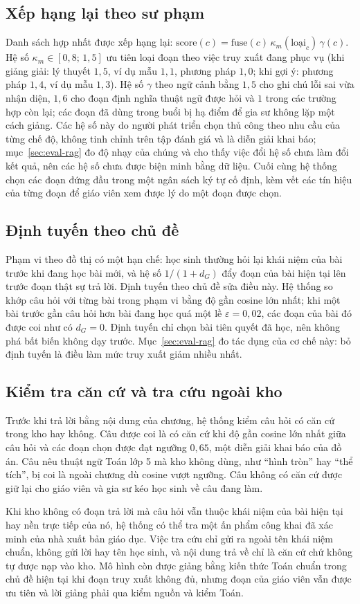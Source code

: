 \subsection{Xếp hạng lại theo sư phạm}
Danh sách hợp nhất được xếp hạng lại: $\mathrm{score}(c)=\mathrm{fuse}(c)\,\kappa_m(\text{loại}_c)\,\gamma(c)$. Hệ số $\kappa_m\in[0{,}8;\,1{,}5]$ ưu tiên loại đoạn theo việc truy xuất đang phục vụ (khi giảng giải: lý thuyết $1{,}5$, ví dụ mẫu $1{,}1$, phương pháp $1{,}0$; khi gợi ý: phương pháp $1{,}4$, ví dụ mẫu $1{,}3$). Hệ số $\gamma$ theo ngữ cảnh bằng $1{,}5$ cho ghi chú lỗi sai vừa nhận diện, $1{,}6$ cho đoạn định nghĩa thuật ngữ được hỏi và $1$ trong các trường hợp còn lại; các đoạn đã dùng trong buổi bị hạ điểm để gia sư không lặp một cách giảng. Các hệ số này do người phát triển chọn thủ công theo nhu cầu của từng chế độ, không tinh chỉnh trên tập đánh giá và là diễn giải khai báo; mục~\ref{sec:eval-rag} đo độ nhạy của chúng và cho thấy việc đổi hệ số chưa làm đổi kết quả, nên các hệ số chưa được biện minh bằng dữ liệu. Cuối cùng hệ thống chọn các đoạn đứng đầu trong một ngân sách ký tự cố định, kèm vết các tín hiệu của từng đoạn để giáo viên xem được lý do một đoạn được chọn.

\subsection{Định tuyến theo chủ đề}
Phạm vi theo đồ thị có một hạn chế: học sinh thường hỏi lại khái niệm của bài trước khi đang học bài mới, và hệ số $1/(1+d_G)$ đẩy đoạn của bài hiện tại lên trước đoạn thật sự trả lời. Định tuyến theo chủ đề sửa điều này. Hệ thống so khớp câu hỏi với từng bài trong phạm vi bằng độ gần cosine lớn nhất; khi một bài trước gần câu hỏi hơn bài đang học quá một lề $\varepsilon=0{,}02$, các đoạn của bài đó được coi như có $d_G=0$. Định tuyến chỉ chọn bài tiên quyết đã học, nên không phá bất biến không dạy trước. Mục~\ref{sec:eval-rag} đo tác dụng của cơ chế này: bỏ định tuyến là điều làm mức truy xuất giảm nhiều nhất.

\subsection{Kiểm tra căn cứ và tra cứu ngoài kho}
Trước khi trả lời bằng nội dung của chương, hệ thống kiểm câu hỏi có căn cứ trong kho hay không. Câu được coi là có căn cứ khi độ gần cosine lớn nhất giữa câu hỏi và các đoạn chọn được đạt ngưỡng $0{,}65$, một diễn giải khai báo của đồ án. Câu nêu thuật ngữ Toán lớp 5 mà kho không dùng, như ``hình tròn'' hay ``thể tích'', bị coi là ngoài chương dù cosine vượt ngưỡng. Câu không có căn cứ được giữ lại cho giáo viên và gia sư kéo học sinh về câu đang làm.

Khi kho không có đoạn trả lời mà câu hỏi vẫn thuộc khái niệm của bài hiện tại hay nền trực tiếp của nó, hệ thống có thể tra một ấn phẩm công khai đã xác minh của nhà xuất bản giáo dục. Việc tra cứu chỉ gửi ra ngoài tên khái niệm chuẩn, không gửi lời hay tên học sinh, và nội dung trả về chỉ là căn cứ chứ không tự được nạp vào kho. Mô hình còn được giảng bằng kiến thức Toán chuẩn trong chủ đề hiện tại khi đoạn truy xuất không đủ, nhưng đoạn của giáo viên vẫn được ưu tiên và lời giảng phải qua kiểm nguồn và kiểm Toán.
